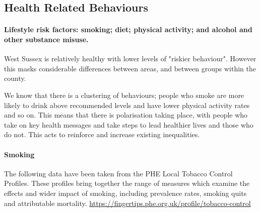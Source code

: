 



\subsection{Health Related Behaviours}
\paragraph{Lifestyle risk factors: smoking; diet; physical activity; and alcohol and other substance misuse.}

West Sussex is relatively healthy with lower levels of "riskier behaviour". However this masks considerable differences between areas, and between groups within the county.

We know that there is a clustering of behaviours; people who smoke are more likely to drink above recommended levels and have lower physical activity rates and so on. This means that there is polarisation taking place, with people who take on key health messages and take steps to lead healthier lives and those who do not. This acts to reinforce and increase existing inequalities.

\paragraph{Smoking}
The following data have been taken from the PHE Local Tobacco Control Profiles. These profiles bring together the range of measures which examine the effects and wider impact of smoking, including prevalence rates, smoking quits and attributable mortality. \url{https://fingertips.phe.org.uk/profile/tobacco-control}

